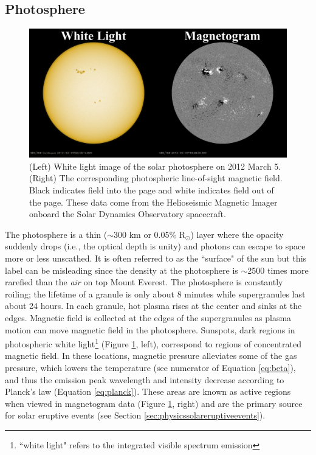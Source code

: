 \subsection{Photosphere}

\begin{figure}[!h]
    \begin{center}
	    \includegraphics[width=\textwidth]{Images/WhiteLightAndMagnetogram.png}
    \end{center}
    \caption[Sunspots and active regions]{
        (Left) White light image of the solar photosphere on 2012 March 5. (Right) The corresponding photospheric 
        line-of-sight magnetic field. Black indicates field into the page and white indicates field out of the page. 
        These data come from the Helioseismic Magnetic Imager onboard the Solar Dynamics Observatory spacecraft. 
    }
    \label{fig:sunspotsandars}
\end{figure}

The photosphere is a thin ($\sim$300 km or 0.05\% R$_\odot$) layer where the opacity suddenly drops (i.e., the optical depth is unity) and photons can escape to space more or less unscathed. It is often referred to as the ``surface" of the sun but this label can be misleading since the density at the photosphere is $\sim$2500 times more rarefied than the \textit{air} on top Mount Everest. The photosphere is constantly roiling; the lifetime of a granule is only about 8 minutes while supergranules last about 24 hours. In each granule, hot plasma rises at the center and sinks at the edges. Magnetic field is collected at the edges of the supergranules as plasma motion can move magnetic field in the photosphere. Sunspots, dark regions in photospheric white light\footnote{``white light" refers to the integrated visible spectrum emission} (Figure \ref{fig:sunspotsandars}, left), correspond to regions of concentrated magnetic field. In these locations, magnetic pressure alleviates some of the gas pressure, which lowers the temperature (see numerator of Equation \ref{eq:beta}), and thus the emission peak wavelength and intensity decrease according to Planck's law (Equation \ref{eq:planck}). These areas are known as active regions when viewed in magnetogram data (Figure \ref{fig:sunspotsandars}, right) and are the primary source for solar eruptive events (see Section \ref{sec:physicssolareruptiveevents}). 

